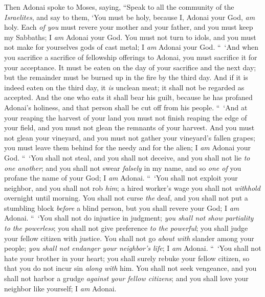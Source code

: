 \begin{biblechapter} %
 Then Adonai spoke to Moses, saying,
\verse “Speak to all the community of the \textit{Israelites}, and say to them, ‘You must be holy, because I, Adonai your God, \textit{am} holy.
\verse Each \textit{of you} must revere your mother and your father, and you must keep my Sabbaths; I \textit{am} Adonai your God.
\verse You must not turn to idols, and you must not make for yourselves gods of cast metal; I \textit{am} Adonai your God.
\verse “ ‘And when you sacrifice a sacrifice of fellowship offerings to Adonai, you must sacrifice it for your acceptance.
\verse It must be eaten on the day of your sacrifice and the next day; but the remainder must be burned up in the fire by the third day.
\verse And if it is indeed eaten on the third day, it \textit{is} unclean meat; it shall not be regarded as accepted.
\verse And the one who eats it shall bear his guilt, because he has profaned Adonai’s holiness, and that person shall be cut off from his people.
 “ ‘And at your reaping the harvest of your land you must not finish reaping the edge of your field, and you must not glean the remnants of your harvest.
\verse And you must not glean your vineyard, and you must not gather your vineyard’s fallen grapes; you must leave them behind for the needy and for the alien; I \textit{am} Adonai your God.
\verse “ ‘You shall not steal, and you shall not deceive, and you shall not lie \textit{to one another};
\verse and you shall not swear \textit{falsely} in my name, and so \textit{one of} you profane the name of your God; I \textit{am} Adonai.
\verse “ ‘You shall not exploit your neighbor, and you shall not rob \textit{him}; a hired worker’s wage you shall not \textit{withhold} overnight until morning.
\verse You shall not curse \textit{the} deaf, and you shall not put a stumbling block \textit{before} a blind person, but you shall revere your God; I \textit{am} Adonai.
\verse “ ‘You shall not do injustice in judgment; \textit{you shall not show partiality to the powerless}; you shall not give preference \textit{to the powerful}; you shall judge your fellow citizen with justice.
\verse You shall not go \textit{about with} slander among your people; \textit{you shall not endanger your neighbor’s life}; I \textit{am} Adonai.
\verse “ ‘You shall not hate your brother in your heart; you shall surely rebuke your fellow citizen, so that you do not incur sin \textit{along with} him.
\verse You shall not seek vengeance, and you shall not harbor a grudge \textit{against} \textit{your fellow citizens}; and you shall love your neighbor like yourself;  I \textit{am} Adonai.

\end{biblechapter}
